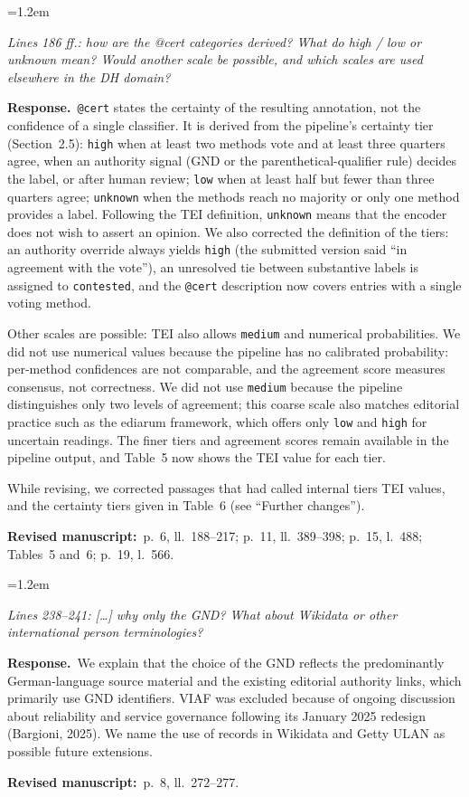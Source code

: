 \documentclass[11pt,a4paper]{article}
\newenvironment{reviewercomment}
  {\par\smallskip\begin{list}{}{\leftmargin=1.2em\rightmargin=0pt}\item[]\color{black!75}\itshape}
  {\end{list}\smallskip}
\newcommand{\response}{\par\noindent\textbf{Response.}~}
\newcommand{\where}[1]{\par\noindent\textbf{Revised manuscript:}~#1\par\medskip}
\begin{document}
\begin{enumerate}[label=\textbf{I\arabic*}, leftmargin=2.2em, itemsep=0.8em]
\item
\begin{reviewercomment}
Lines 186 ff.: how are the @cert categories derived? What do high / low or unknown mean? Would another
scale be possible, and which scales are used elsewhere in the DH domain?
\end{reviewercomment}
\response \texttt{@cert} states the certainty of the resulting annotation, not the confidence of a
single classifier. It is derived from the pipeline's certainty tier (Section~2.5): \texttt{high} when
at least two methods vote and at least three quarters agree, when an authority signal (GND or the
parenthetical-qualifier rule) decides the label, or after human review; \texttt{low} when at least
half but fewer than three quarters agree; \texttt{unknown} when the methods reach no majority or only
one method provides a label. Following the TEI definition, \texttt{unknown} means that the encoder does
not wish to assert an opinion. We also corrected the definition of the tiers: an authority override always yields
\texttt{high} (the submitted version said ``in agreement with the vote''), an unresolved tie between
substantive labels is assigned to \texttt{contested}, and the \texttt{@cert} description now covers
entries with a single voting method.

Other scales are possible: TEI also allows \texttt{medium} and numerical probabilities. We did not use
numerical values because the pipeline has no calibrated probability: per-method confidences are not
comparable, and the agreement score measures consensus, not correctness. We did not use
\texttt{medium} because the pipeline distinguishes only two levels of agreement; this coarse scale
also matches editorial practice such as the ediarum framework, which offers only \texttt{low} and
\texttt{high} for uncertain readings. The finer tiers and agreement scores remain available in the pipeline output, and
Table~5 now shows the TEI value for each tier.

While revising, we corrected passages that had called internal tiers TEI values, and the certainty
tiers given in Table~6 (see ``Further changes'').
\where{p.~6, ll.~188--217; p.~11, ll.~389--398; p.~15, l.~488; Tables~5 and~6; p.~19, l.~566.}

\item
\begin{reviewercomment}
Lines 238--241: [\dots] why only the GND? What about Wikidata or other international person
terminologies?
\end{reviewercomment}
\response We explain that the choice of the GND reflects the predominantly German-language source
material and the existing editorial authority links, which primarily use GND identifiers. VIAF was
excluded because of ongoing discussion about reliability and service governance following its January
2025 redesign (Bargioni, 2025). We name the use of records in Wikidata and Getty ULAN as possible
future extensions.
\where{p.~8, ll.~272--277.}


\end{enumerate}
\end{document}
